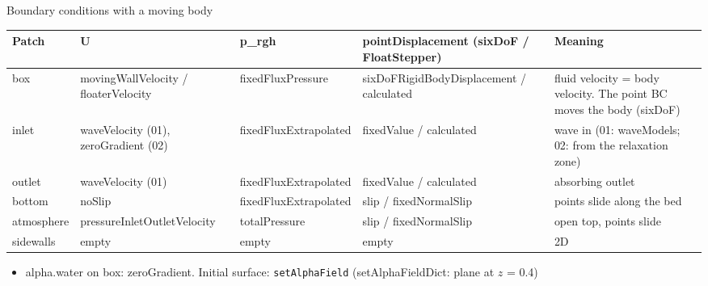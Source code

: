 \documentclass[aspectratio=169,10pt]{beamer}
\newcommand{\file}[1]{{\leavevmode\ttfamily\color{deep}#1}}
\newcommand{\key}[1]{{\leavevmode\ttfamily\color{sea}#1}}
\begin{document}
\begin{frame}{Boundary conditions with a moving body}
  \footnotesize
  \renewcommand{\arraystretch}{1.15}
  \begin{tabularx}{\linewidth}{@{}P{1.7cm}P{2.6cm}P{2.6cm}P{2.6cm}L@{}}
    \toprule
    Patch & \key{U} & \key{p\_rgh} & \key{pointDisplacement} (sixDoF / FloatStepper) & Meaning \\
    \midrule
    \key{box} & movingWallVelocity / floaterVelocity & fixedFluxPressure & sixDoFRigidBody\-Displacement / calculated & fluid velocity = body velocity. The point BC moves the body (sixDoF) \\
    \key{inlet} & waveVelocity (01), zeroGradient (02) & fixedFlux\-Extrapolated & fixedValue / calculated & wave in (01: waveModels; 02: from the relaxation zone) \\
    \key{outlet} & waveVelocity (01) & fixedFlux\-Extrapolated & fixedValue / calculated & absorbing outlet \\
    \key{bottom} & noSlip & fixedFlux\-Extrapolated & slip / fixedNormalSlip & points slide along the bed \\
    \key{atmosphere} & pressureInlet\-OutletVelocity & totalPressure & slip / fixedNormalSlip & open top, points slide \\
    \key{sidewalls} & empty & empty & empty & 2D \\
    \bottomrule
  \end{tabularx}

  \vspace{3mm}\small
  \begin{itemize}
    \item \key{alpha.water} on \key{box}: zeroGradient. Initial surface: \texttt{setAlphaField}
          (\file{setAlphaFieldDict}: plane at $z$ = 0.4)
  \end{itemize}
\end{frame}
\end{document}
